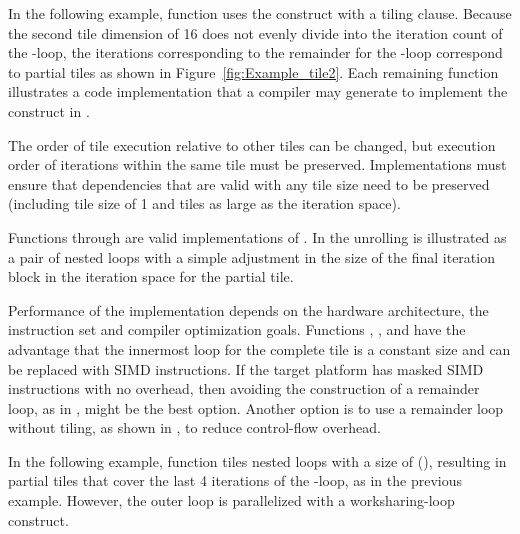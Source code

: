 In the following example, function  uses the  construct
with a  tiling clause.  Because the second tile dimension of
16 does not evenly divide into the iteration count of the -loop, the
iterations corresponding to the remainder for the -loop correspond to partial
tiles as shown in Figure~\ref{fig:Example_tile2}. Each remaining function
illustrates a code implementation that a compiler may generate to implement the
 construct in .

The order of tile execution relative to other tiles can be changed, but execution order of 
iterations within the same tile must be preserved.
Implementations must ensure that dependencies that are valid with any tile size need
to be preserved (including tile size of 1 and tiles as large as the iteration space).

Functions  through  are valid implementations of .
In  the unrolling is illustrated as a pair of nested loops with a simple
adjustment in the size of the final iteration block in the  iteration space
for the partial tile.

Performance of the implementation depends on the hardware architecture, the instruction set and compiler optimization goals.
Functions , , and  have the advantage that
the innermost loop for the complete tile is a constant size and can be replaced with SIMD instructions.
If the target platform has masked SIMD instructions with no overhead, then avoiding the construction of a
remainder loop, as in , might be the best option.
Another option is to use a remainder loop without tiling, as shown in , to reduce control-flow overhead.



In the following example, function  tiles nested loops with a size of (),
resulting in partial tiles that cover the last 4 iterations of the -loop, as
in the previous example.  However, the outer loop is parallelized with a
 worksharing-loop construct.

